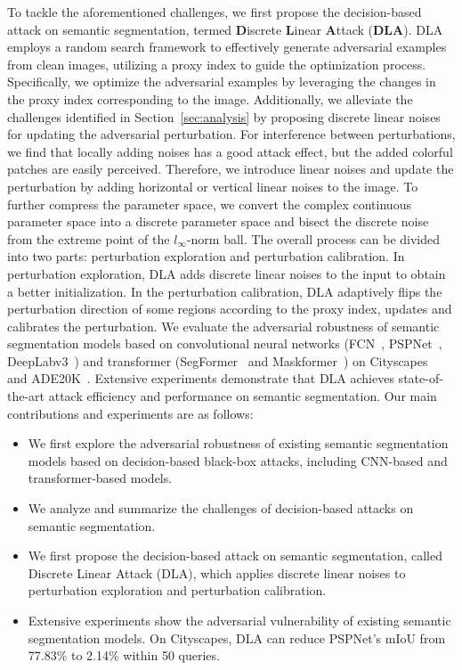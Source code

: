 \documentclass[10pt,twocolumn,letterpaper]{article}
\begin{document}
To tackle the aforementioned challenges, we first propose the decision-based attack on semantic segmentation, termed \textbf{D}iscrete \textbf{L}inear \textbf{A}ttack (\textbf{DLA}). DLA employs a random search framework to effectively generate adversarial examples from clean images, utilizing a proxy index to guide the optimization process. Specifically, we optimize the adversarial examples by leveraging the changes in the proxy index corresponding to the image. Additionally, we alleviate the challenges identified in Section~\ref{sec:analysis} by proposing discrete linear noises for updating the adversarial perturbation. For interference between perturbations, we find that locally adding noises has a good attack effect, but the added colorful patches are easily perceived. Therefore, we introduce linear noises and update the perturbation by adding horizontal or vertical linear noises to the image. To further compress the parameter space, we convert the complex continuous parameter space into a discrete parameter space and bisect the discrete noise from the extreme point of the $l_\infty$-norm ball. 
The overall process can be divided into two parts: perturbation exploration and perturbation calibration. In perturbation exploration, DLA adds discrete linear noises to the input to obtain a better initialization. In the perturbation calibration, DLA adaptively flips the perturbation direction of some regions according to the proxy index, updates and calibrates the perturbation.
We evaluate the adversarial robustness of semantic segmentation models based on convolutional neural networks (FCN~\cite{fcn}, PSPNet~\cite{pspnet}, DeepLabv3~\cite{deeplabv3}) and transformer (SegFormer~\cite{segformer} and Maskformer~\cite{maskformer}) on Cityscapes~\cite{cityscapes} and ADE20K~\cite{ade20k}. Extensive experiments demonstrate that DLA achieves state-of-the-art attack efficiency and performance on semantic segmentation.
Our main contributions and experiments are as follows:

\begin{itemize}
    \item We first explore the adversarial robustness of existing semantic segmentation models based on decision-based black-box attacks, including CNN-based and transformer-based models.
    \item We analyze and summarize the challenges of decision-based attacks on semantic segmentation.
    \item We first propose the decision-based attack on semantic segmentation, called Discrete Linear Attack (DLA), which applies discrete linear noises to perturbation exploration and perturbation calibration.
    \item Extensive experiments show the adversarial vulnerability of existing semantic segmentation models. On Cityscapes, DLA can reduce PSPNet’s mIoU from 77.83\% to 2.14\% within 50 queries.
\end{itemize}
\end{document}
